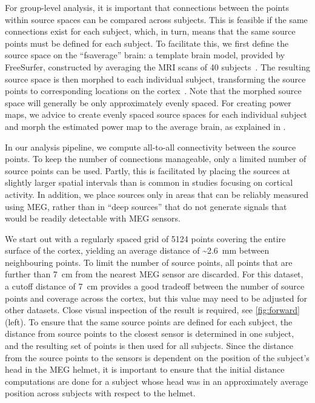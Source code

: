 \documentclass[utf8]{frontiersSCNS}
\renewcommand{\cite}[1]{~\citep{#1}}
\newcommand{\textcite}[1]{\citet{#1}}
\begin{document}
For group-level analysis, it is important that connections between the points within source spaces can be compared across subjects.
This is feasible if the same connections exist for each subject, which, in turn, means that the same source points must be defined for each subject.
To facilitate this, we first define the source space on the ``fsaverage'' brain: a template brain model, provided by FreeSurfer, constructed by averaging the MRI scans of 40 subjects\cite{Fischl1999}.
The resulting source space is then morphed to each individual subject, transforming the source points to corresponding locations on the cortex\cite{Fischl1999}.
Note that the morphed source space will generally be only approximately evenly spaced.
For creating power maps, we advice to create evenly spaced source spaces for each individual subject and morph the estimated power map to the average brain, as explained in \textcite{Jas2017}.

In our analysis pipeline, we compute all-to-all connectivity between the source points.
To keep the number of connections manageable, only a limited number of source points can be used.
Partly, this is facilitated by placing the sources at slightly larger spatial intervals than is common in studies focusing on cortical activity.
In addition, we place sources only in areas that can be reliably measured using MEG, rather than in ``deep sources'' that do not generate signals that would be readily detectable with MEG sensors.

We start out with a regularly spaced grid of 5124 points covering the entire surface of the cortex, yielding an average distance of \SI{~2.6}{\milli\meter} between neighbouring points.
To limit the number of source points, all points that are further than \SI{7}{\centi\meter} from the nearest MEG sensor are discarded.
For this dataset, a cutoff distance of \SI{7}{\centi\meter} provides a good tradeoff between the number of source points and coverage across the cortex, but this value may need to be adjusted for other datasets.
Close visual inspection of the result is required, see \autoref{fig:forward} (left).
To ensure that the same source points are defined for each subject, the distance from source points to the closest sensor is determined in one subject, and the resulting set of points is then used for all subjects.
Since the distance from the source points to the sensors is dependent on the position of the subject's head in the MEG helmet, it is important to ensure that the initial distance computations are done for a subject whose head was in an approximately average position across subjects with respect to the helmet.
\end{document}
